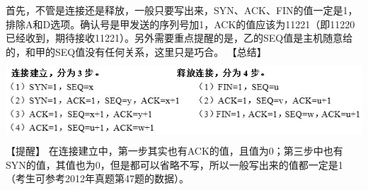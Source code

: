 \begin{solution}首先，不管是连接还是释放，一般只要写出来，SYN、ACK、FIN的值一定是1，排除A和D选项。确认号是甲发送的序列号加1，ACK的值应该为11221（即11220已经收到，期待接收11221）。另外需要重点提醒的是，乙的SEQ值是主机随意给的，和甲的SEQ值没有任何关系，这里只是巧合。
【总结】
\includegraphics[width=6.23958in,height=1.20833in]{computerassets/0349051efcbc98e2d82b387bf89b9028.jpeg}
【提醒】
在连接建立中，第一步其实也有ACK的值，且值为0；第三步中也有SYN的值，其值也为0，但是都可以省略不写，所以一般写出来的值都一定是1（考生可参考2012年真题第47题的数据）。
\end{solution}
